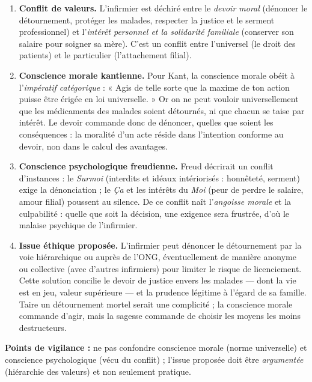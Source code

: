 \documentclass[11pt]{article}
\begin{document}
\begin{corrige}
\begin{enumerate}
    \item \textbf{Conflit de valeurs.} L'infirmier est déchiré entre le \emph{devoir moral} (dénoncer le détournement, protéger les malades, respecter la justice et le serment professionnel) et l'\emph{intérêt personnel et la solidarité familiale} (conserver son salaire pour soigner sa mère). C'est un conflit entre l'universel (le droit des patients) et le particulier (l'attachement filial).
    \item \textbf{Conscience morale kantienne.} Pour Kant, la conscience morale obéit à l'\emph{impératif catégorique} : « Agis de telle sorte que la maxime de ton action puisse être érigée en loi universelle. » Or on ne peut vouloir universellement que les médicaments des malades soient détournés, ni que chacun se taise par intérêt. Le devoir commande donc de dénoncer, quelles que soient les conséquences : la moralité d'un acte réside dans l'intention conforme au devoir, non dans le calcul des avantages.
    \item \textbf{Conscience psychologique freudienne.} Freud décrirait un conflit d'instances : le \emph{Surmoi} (interdits et idéaux intériorisés : honnêteté, serment) exige la dénonciation ; le \emph{Ça} et les intérêts du \emph{Moi} (peur de perdre le salaire, amour filial) poussent au silence. De ce conflit naît l'\emph{angoisse morale} et la culpabilité : quelle que soit la décision, une exigence sera frustrée, d'où le malaise psychique de l'infirmier.
    \item \textbf{Issue éthique proposée.} L'infirmier peut dénoncer le détournement par la voie hiérarchique ou auprès de l'ONG, éventuellement de manière anonyme ou collective (avec d'autres infirmiers) pour limiter le risque de licenciement. Cette solution concilie le devoir de justice envers les malades — dont la vie est en jeu, valeur supérieure — et la prudence légitime à l'égard de sa famille. Taire un détournement mortel serait une complicité ; la conscience morale commande d'agir, mais la sagesse commande de choisir les moyens les moins destructeurs.
\end{enumerate}
\textbf{Points de vigilance :} ne pas confondre conscience morale (norme universelle) et conscience psychologique (vécu du conflit) ; l'issue proposée doit être \emph{argumentée} (hiérarchie des valeurs) et non seulement pratique.
\end{corrige}
\end{document}
